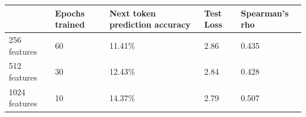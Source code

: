 \begin{table}[!ht]
\begin{tabular}{|l|l|l|l|l|}
\hline
              & Epochs trained & Next token prediction accuracy & Test Loss & Spearman's rho\\ \hline
256 features  & 60             & 11.41\%                        & 2.86      & 0.435         \\ \hline
512 features  & 30             & 12.43\%                        & 2.84      & 0.428         \\ \hline
1024 features & 10             & 14.37\%                        & 2.79      & 0.507         \\ \hline
\end{tabular}
\end{table}
